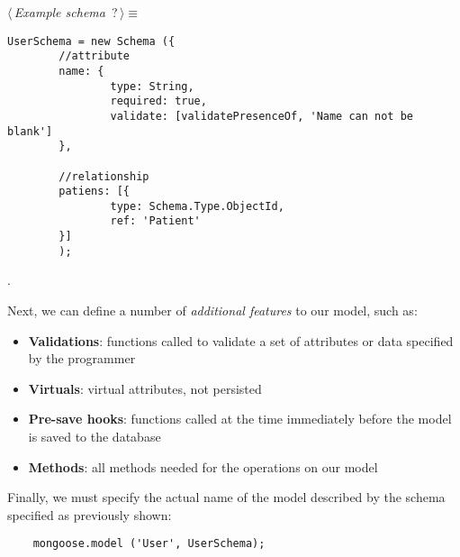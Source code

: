 \begin{flushleft} \small
\begin{minipage}{\linewidth}\label{scrap1}\raggedright\small
{} $\langle\,${\itshape {Example schema}}\nobreak\ {\footnotesize {?}}$\,\rangle\equiv$
\vspace{-1ex}
\begin{list}{}{} \item

\begin{lstlisting} 
UserSchema = new Schema ({
        //attribute
        name: {
                type: String,
                required: true,
                validate: [validatePresenceOf, 'Name can not be blank']
        },

        //relationship
        patiens: [{
                type: Schema.Type.ObjectId,
                ref: 'Patient'
        }]
        ); 
\end{lstlisting}
{\NWsep}
\end{list}
\vspace{-1.5ex}
\footnotesize
\begin{list}{}{\setlength{\itemsep}{-\parsep}\setlength{\itemindent}{-\leftmargin}}
\item {\NWtxtMacroNoRef}.

\item{}
\end{list}
\end{minipage}\vspace{4ex}
\end{flushleft}
Next, we can define a number of \emph{additional features} to our model, such as:

\begin{itemize}
	\item \textbf{Validations}: functions called to validate a set of attributes or data specified by the programmer
	\item \textbf{Virtuals}: virtual attributes, not persisted
	\item \textbf{Pre-save hooks}: functions called at the time immediately before the model is saved to the database
	\item \textbf{Methods}: all methods needed for the operations on our model 
\end{itemize}

Finally, we must specify the actual name of the model described by the schema specified as previously shown:

\begin{lstlisting}
	mongoose.model ('User', UserSchema);
\end{lstlisting}

